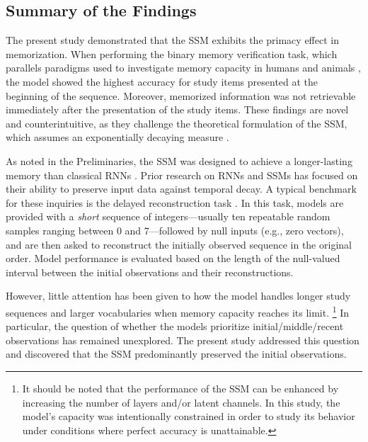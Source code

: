 \documentclass[10pt,letterpaper]{article}
\begin{document}
\subsection{Summary of the Findings}

The present study demonstrated that the SSM exhibits the primacy effect in memorization.
When performing the binary memory verification task, which parallels paradigms used to investigate memory capacity in humans and animals \citep{WickelgrenNorman66,ThompsonHerman77,SandsWright80,Wright+85}, the model showed the highest accuracy for study items presented at the beginning of the sequence.
Moreover, memorized information was not retrievable immediately after the presentation of the study items.
These findings are novel and counterintuitive, as they challenge the theoretical formulation of the SSM, which assumes an exponentially decaying measure \citep[for Legendre and Laguerre bases; Fig~\ref{fig:kernel};][]{Gu+23_ICLR}.


As noted in the Preliminaries, the SSM was designed to achieve a longer-lasting memory than classical RNNs \citep{Gu+20}.
Prior research on RNNs and SSMs has focused on their ability to preserve input data against temporal decay.
A typical benchmark for these inquiries is the delayed reconstruction task \citep[a.k.a. the \emph{copying memory task};][]{Arjovsky+16}.
In this task, models are provided with a \emph{short} sequence of integers---usually ten repeatable random samples ranging between 0 and 7---followed by null inputs (e.g., zero vectors), and are then asked to reconstruct the initially observed sequence in the original order.
Model performance is evaluated based on the length of the null-valued interval between the initial observations and their reconstructions.


However, little attention has been given to how the model handles longer study sequences and larger vocabularies when memory capacity reaches its limit.%
\footnote{
	It should be noted that the performance of the SSM can be enhanced by increasing the number of layers and/or latent channels.
	In this study, the model's capacity was intentionally constrained in order to study its behavior under conditions where perfect accuracy is unattainable.
}
In particular, the question of whether the models prioritize initial/middle/recent observations has remained unexplored.
The present study addressed this question and discovered that the SSM predominantly preserved the initial observations.
\end{document}
